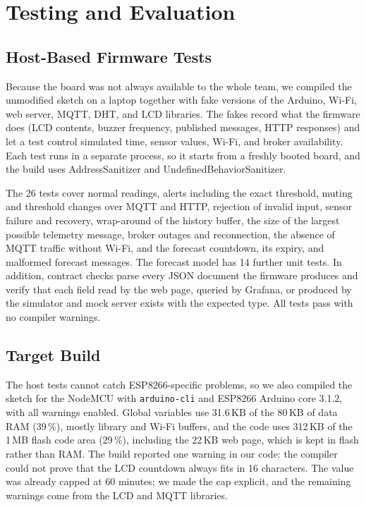 \documentclass[conference]{IEEEtran}
\newcommand{\code}[1]{\texttt{\small #1}}
\begin{document}
\section{Testing and Evaluation}
\label{sec:eval}

\subsection{Host-Based Firmware Tests}
Because the board was not always available to the whole team, we compiled the
unmodified sketch on a laptop together with fake versions of the Arduino, Wi-Fi, web
server, MQTT, DHT, and LCD libraries. The fakes record what the firmware does (LCD
contents, buzzer frequency, published messages, HTTP responses) and let a test control
simulated time, sensor values, Wi-Fi, and broker availability. Each test runs in a
separate process, so it starts from a freshly booted board, and the build uses
AddressSanitizer and UndefinedBehaviorSanitizer.

The 26 tests cover normal readings, alerts including the exact threshold, muting and
threshold changes over MQTT and HTTP, rejection of invalid input, sensor failure and
recovery, wrap-around of the history buffer, the size of the largest possible telemetry
message, broker outages and reconnection, the absence of MQTT traffic without Wi-Fi, and
the forecast countdown, its expiry, and malformed forecast messages. The forecast model
has 14 further unit tests. In addition, contract checks parse every JSON document the firmware produces
and verify that each field read by the web page, queried by Grafana, or produced by
the simulator and mock server exists with the expected type. All tests pass with no
compiler warnings.

\subsection{Target Build}
The host tests cannot catch ESP8266-specific problems, so we also compiled the sketch for
the NodeMCU with \code{arduino-cli} and ESP8266 Arduino core 3.1.2, with all warnings
enabled. Global variables use 31.6\,KB of the 80\,KB of data RAM (39\,\%), mostly
library and Wi-Fi buffers, and the code uses 312\,KB of the 1\,MB flash code area
(29\,\%), including the 22\,KB web page, which is kept in flash rather than RAM. The build reported one
warning in our code: the compiler could not prove that the LCD countdown always fits in 16
characters. The value was already capped at 60 minutes; we made the cap explicit, and the
remaining warnings come from the LCD and MQTT libraries.
\end{document}
